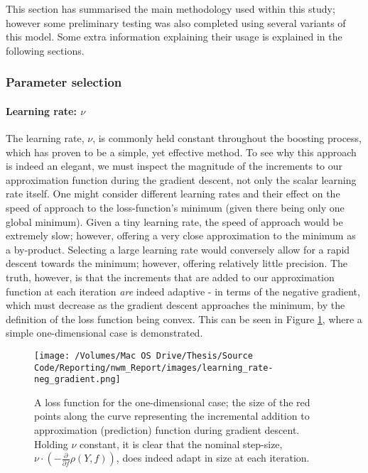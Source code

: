 \documentclass{article}
\begin{document}
This section has summarised the main methodology used within this study; however some preliminary testing was also completed using several variants of this model. Some extra information explaining their usage is explained in the following sections.


\subsubsection{Parameter selection \label{param-selection}}
\label{sec-5-4-2}


\paragraph{Learning rate: $\nu$ \label{nu}}
\label{sec-5-4-2-1}

The learning rate, $\nu$, is commonly held constant throughout the boosting process, which has proven to be a simple, yet effective method. To see why this approach is indeed an elegant, we must inspect the magnitude of the increments to our approximation function during the gradient descent, not only the scalar learning rate itself. One might consider different learning rates and their effect on the speed of approach to the loss-function's minimum (given there being only one global minimum). Given a tiny learning rate, the speed of approach would be extremely slow; however, offering a very close approximation to the minimum as a by-product. Selecting a large learning rate would conversely allow for a rapid descent towards the minimum; however, offering relatively little precision. The truth, however, is that the increments that are added to our approximation function at each iteration \emph{are} indeed adaptive - in terms of the negative gradient, which must decrease as the gradient descent approaches the minimum, by the definition of the loss function being convex. This can be seen in Figure \ref{fig:grad-descent}, where a simple one-dimensional case is demonstrated.

\begin{figure}[htb]
\centering
\texttt{[image: /Volumes/Mac OS Drive/Thesis/Source Code/Reporting/nwm\_Report/images/learning\_rate-neg\_gradient.png]}
\caption[An example loss function for the one-dimensional case]{\label{fig:grad-descent}A loss function for the one-dimensional case; the size of the red points along the curve representing the incremental addition to approximation (prediction) function during gradient descent. Holding $\nu$ constant, it is clear that the nominal step-size, $\nu \cdot \left( - \frac{\partial}{\partial f}\rho (Y, f)\right)$, does indeed adapt in size at each iteration.}
\end{figure}
\end{document}
